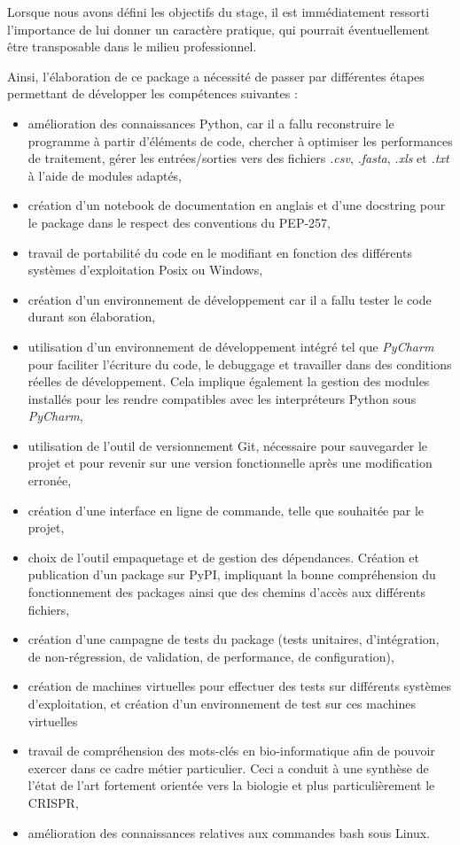 \documentclass[twoside,a4paper,11pt,frenchb,openany]{report}
\begin{document}
Lorsque nous avons défini les objectifs du stage, il est immédiatement ressorti l'importance de lui donner un caractère pratique, qui pourrait éventuellement être transposable dans le milieu professionnel.

Ainsi, l'élaboration de ce package a nécessité de passer par différentes étapes permettant de développer les compétences suivantes :
\begin{itemize}
\item amélioration des connaissances Python, car il a fallu reconstruire le programme à partir d'éléments de code, chercher à optimiser les performances de traitement, gérer les entrées/sorties vers des fichiers \textit{.csv}, \textit{.fasta}, \textit{.xls} et \textit{.txt} à l'aide de modules adaptés, 
\item création d'un notebook de documentation en anglais et d'une docstring pour le package dans le respect des conventions du PEP-257,
\item travail de portabilité du code en le modifiant en fonction des différents systèmes d'exploitation Posix ou Windows,
\item création d'un environnement de développement car il a fallu tester le code durant son élaboration,
\item utilisation d'un environnement de développement intégré tel que \textit{PyCharm} pour faciliter l'écriture du code, le debuggage et travailler dans des conditions réelles de développement. Cela implique également la gestion des modules installés pour les rendre compatibles avec les interpréteurs Python sous \textit{PyCharm},
\item utilisation de l'outil de versionnement Git, nécessaire pour sauvegarder le projet et pour revenir sur une version fonctionnelle après une modification erronée, 
\item création d'une interface en ligne de commande, telle que souhaitée par le projet,
\item choix de l'outil empaquetage et de gestion des dépendances. Création et publication d'un package sur PyPI, impliquant la bonne compréhension du fonctionnement des packages ainsi que des chemins d'accès aux différents fichiers, 
\item création d'une campagne de tests du package (tests unitaires, d'intégration, de non-régression, de validation, de performance, de configuration),
\item création de machines virtuelles pour effectuer des tests sur différents systèmes d'exploitation, et création d'un environnement de test sur ces machines virtuelles
\item travail de compréhension des mots-clés en bio-informatique afin de pouvoir exercer dans ce cadre métier particulier. Ceci a conduit à une synthèse de l'état de l'art fortement orientée vers la biologie et plus particulièrement le CRISPR,
\item amélioration des connaissances relatives aux commandes bash sous Linux.
\end{itemize}
\end{document}

